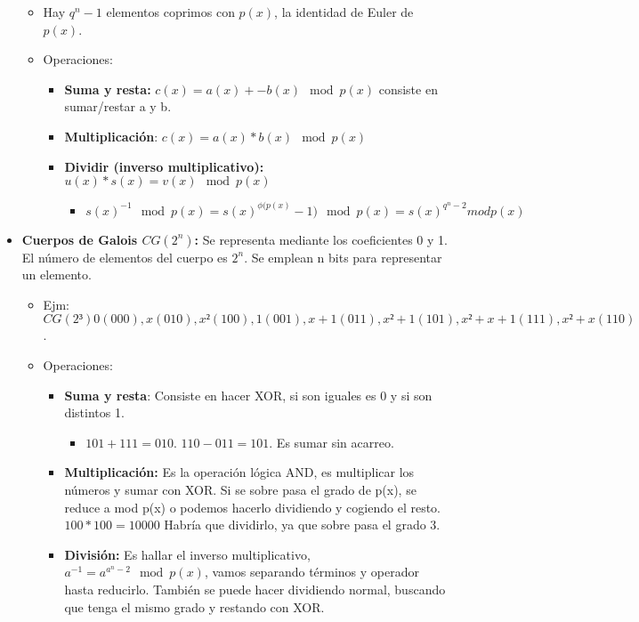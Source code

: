 \documentclass[12pt, twoside, openright]{report} %
\begin{document}
\begin{itemize}
\begin{itemize}
		      \item Hay $q^n -1$ elementos coprimos con $p(x)$, la identidad de Euler de $p(x)$.
		      \item Operaciones:
		            \begin{itemize}
			            \item \textbf{Suma y resta:} $c(x)=a(x)+-b(x) \mod p(x)$ consiste en sumar/restar a y b.
			            \item \textbf{Multiplicación}: $c(x)=a(x)*b(x) \mod p(x)$
			            \item \textbf{Dividir (inverso multiplicativo):} $u(x)*s(x)=v(x) \mod p(x)$
			                  \begin{itemize}
				                  \item $s(x)^{-1} \mod p(x) = s(x)^{\phi(p(x)} -1) \mod p(x) = s(x)^{q^n -2} mod p(x)$
			                  \end{itemize}
		            \end{itemize}
	      \end{itemize}
	\item \textbf{Cuerpos de Galois $CG(2^n)$:} Se representa mediante los coeficientes 0 y 1. El número de elementos del cuerpo es $2^n$. Se emplean n bits para representar un elemento.
	      \begin{itemize}
		      \item Ejm: $CG(2³) 0 (0 0 0), x (0 1 0), x² (1 0 0), 1 (0 0 1), x+1 (0 1 1), x²+1 (1 0 1), x²+x+1 (1 1 1), x²+x (1 1 0)$.
		      \item Operaciones:
		            \begin{itemize}
			            \item \textbf{Suma y resta}: Consiste en hacer XOR, si son iguales es 0 y si son distintos 1.
			                  \begin{itemize}
				                  \item $101+111=010$. $110-011=101$. Es sumar sin acarreo.
			                  \end{itemize}
			            \item \textbf{Multiplicación:} Es la operación lógica AND, es multiplicar los números y sumar con XOR. Si se sobre pasa el grado de p(x), se reduce a mod p(x) o podemos hacerlo dividiendo y cogiendo el resto. $100*100=10000$ Habría que dividirlo, ya que sobre pasa el grado 3.
			            \item \textbf{División:} Es hallar el inverso multiplicativo,
			                  $a^{-1}=a^{a^n -2} \mod p(x)$, vamos separando términos y operador hasta reducirlo. También se puede hacer dividiendo normal, buscando que tenga el mismo grado y restando con XOR.

\end{itemize}
\end{itemize}
\end{itemize}
\end{document}

